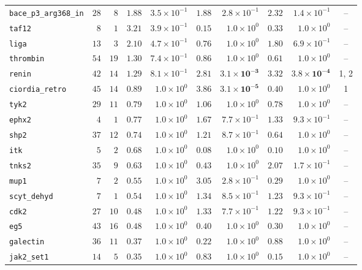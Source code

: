 \begin{table}[tp]
\begin{tabular}{@{}lrrrrrrrrc@{}}
\texttt{bace\_p3\_arg368\_in} & $28$ & $8$ & $1.88$ & $3.5{\times}10^{-1}$ & $1.88$ & $2.8{\times}10^{-1}$ & $2.32$ & $1.4{\times}10^{-1}$ & -- \\
\texttt{taf12} & $8$ & $1$ & $3.21$ & $3.9{\times}10^{-1}$ & $0.15$ & $1.0{\times}10^{0}$ & $0.33$ & $1.0{\times}10^{0}$ & -- \\
\texttt{liga} & $13$ & $3$ & $2.10$ & $4.7{\times}10^{-1}$ & $0.76$ & $1.0{\times}10^{0}$ & $1.80$ & $6.9{\times}10^{-1}$ & -- \\
\texttt{thrombin} & $54$ & $19$ & $1.30$ & $7.4{\times}10^{-1}$ & $0.86$ & $1.0{\times}10^{0}$ & $0.61$ & $1.0{\times}10^{0}$ & -- \\
\texttt{renin} & $42$ & $14$ & $1.29$ & $8.1{\times}10^{-1}$ & $\mathbf{2.81}$ & $\mathbf{3.1{\times}10^{-3}}$ & $\mathbf{3.32}$ & $\mathbf{3.8{\times}10^{-4}}$ & 1, 2 \\
\texttt{ciordia\_retro} & $45$ & $14$ & $0.89$ & $1.0{\times}10^{0}$ & $\mathbf{3.86}$ & $\mathbf{3.1{\times}10^{-5}}$ & $0.40$ & $1.0{\times}10^{0}$ & 1 \\
\texttt{tyk2} & $29$ & $11$ & $0.79$ & $1.0{\times}10^{0}$ & $1.06$ & $1.0{\times}10^{0}$ & $0.78$ & $1.0{\times}10^{0}$ & -- \\
\texttt{ephx2} & $4$ & $1$ & $0.77$ & $1.0{\times}10^{0}$ & $1.67$ & $7.7{\times}10^{-1}$ & $1.33$ & $9.3{\times}10^{-1}$ & -- \\
\texttt{shp2} & $37$ & $12$ & $0.74$ & $1.0{\times}10^{0}$ & $1.21$ & $8.7{\times}10^{-1}$ & $0.64$ & $1.0{\times}10^{0}$ & -- \\
\texttt{itk} & $5$ & $2$ & $0.68$ & $1.0{\times}10^{0}$ & $0.08$ & $1.0{\times}10^{0}$ & $0.10$ & $1.0{\times}10^{0}$ & -- \\
\texttt{tnks2} & $35$ & $9$ & $0.63$ & $1.0{\times}10^{0}$ & $0.43$ & $1.0{\times}10^{0}$ & $2.07$ & $1.7{\times}10^{-1}$ & -- \\
\texttt{mup1} & $7$ & $2$ & $0.55$ & $1.0{\times}10^{0}$ & $3.05$ & $2.8{\times}10^{-1}$ & $0.29$ & $1.0{\times}10^{0}$ & -- \\
\texttt{scyt\_dehyd} & $7$ & $1$ & $0.54$ & $1.0{\times}10^{0}$ & $1.34$ & $8.5{\times}10^{-1}$ & $1.23$ & $9.3{\times}10^{-1}$ & -- \\
\texttt{cdk2} & $27$ & $10$ & $0.48$ & $1.0{\times}10^{0}$ & $1.33$ & $7.7{\times}10^{-1}$ & $1.22$ & $9.3{\times}10^{-1}$ & -- \\
\texttt{eg5} & $43$ & $16$ & $0.48$ & $1.0{\times}10^{0}$ & $0.40$ & $1.0{\times}10^{0}$ & $0.30$ & $1.0{\times}10^{0}$ & -- \\
\texttt{galectin} & $36$ & $11$ & $0.37$ & $1.0{\times}10^{0}$ & $0.22$ & $1.0{\times}10^{0}$ & $0.88$ & $1.0{\times}10^{0}$ & -- \\
\texttt{jak2\_set1} & $14$ & $5$ & $0.35$ & $1.0{\times}10^{0}$ & $0.83$ & $1.0{\times}10^{0}$ & $0.15$ & $1.0{\times}10^{0}$ & -- \\
\bottomrule
\end{tabular}
\end{table}

